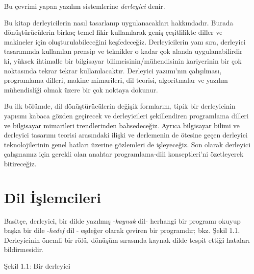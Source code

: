 \documentclass{book}
\begin{document}
Bu çevrimi yapan yazılım sistemlerine  \textit{derleyici} denir.

Bu kitap derleyicilerin nasıl tasarlanıp uygulanacakları hakkındadır. Burada dönüştürücülerin birkaç temel fikir kullanılarak geniş çeşitlilikte diller ve makineler için oluşturulabileceğini keşfedeceğiz. Derleyicilerin yanı sıra, derleyici tasarımında kullanılan prensip ve teknikler o kadar çok alanda uygulanabilirdir ki, yüksek ihtimalle bir bilgisayar bilimcisinin/mühendisinin kariyerinin bir çok noktasında tekrar tekrar kullanılacaktır. Derleyici yazımı'nın çalışılması, programlama dilleri, makine mimarileri, dil teorisi, algoritmalar ve yazılım mühendisliği olmak üzere bir çok noktaya dokunur.

Bu ilk bölümde, dil dönüştürücülerin değişik formlarını, tipik bir derleyicinin yapısını kabaca gözden geçirecek ve derleyicileri şekillendiren programlama dilleri ve bilgisayar mimarileri trendlerinden bahsedeceğiz. Ayrıca bilgisayar bilimi ve derleyici tasarımı teorisi arasındaki ilişki ve derlemenin de ötesine geçen derleyici teknolojilerinin genel hatları üzerine gözlemleri de işleyeceğiz. Son olarak derleyici çalışmamız için gerekli olan anahtar programlama-dili konseptleri'ni özetleyerek bitireceğiz.

\section{Dil İşlemcileri}
Basitçe, derleyici, bir dilde yazılmış -\textit{kaynak} dil- herhangi bir programı okuyup başka bir dile -\textit{hedef} dil -  eşdeğer olarak çeviren bir programdır; bkz. Şekil 1.1. Derleyicinin önemli bir rölü, dönüşüm sırasında kaynak dilde tespit ettiği hataları bildirmesidir.

\begin{center}
\break

Şekil 1.1: Bir derleyici
\break

\end{center}
\end{document}
